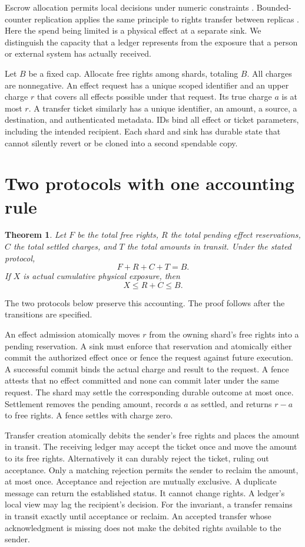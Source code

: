 \documentclass[11pt]{article}
\newtheorem{theorem}{Theorem}
\begin{document}
Escrow allocation permits local decisions under numeric constraints
\cite{oneil}. Bounded-counter replication applies the same principle
to rights transfer between replicas \cite{balegas}. Here the spend
being limited is a physical effect at a separate sink. We distinguish
the capacity that a ledger represents from the exposure that a person
or external system has actually received.

Let $B$ be a fixed cap. Allocate free rights among shards, totaling
$B$. All charges are nonnegative. An effect request has a unique
scoped identifier and an upper charge $r$ that covers all effects
possible under that request. Its true charge $a$ is at most $r$.
A transfer ticket similarly has a unique identifier, an amount,
a source, a destination, and authenticated metadata. IDs bind all
effect or ticket parameters, including the intended recipient.
Each shard and sink has durable state that cannot silently revert
or be cloned into a second spendable copy.

\section{Two protocols with one accounting rule}
\begin{theorem}
Let $F$ be the total free rights, $R$ the total pending effect
reservations, $C$ the total settled charges, and $T$ the total
amounts in transit. Under the stated protocol,
\[
F+R+C+T=B.
\]
If $X$ is actual cumulative physical exposure, then
\[
X\le R+C\le B.
\]
\end{theorem}

The two protocols below preserve this accounting. The proof follows
after the transitions are specified.

An effect admission atomically moves $r$ from the owning shard's
free rights into a pending reservation. A sink must enforce that
reservation and atomically either commit the authorized effect
once or fence the request against future execution. A successful
commit binds the actual charge and result to the request. A fence
attests that no effect committed and none can commit later under
the same request. The shard may settle the corresponding durable
outcome at most once. Settlement removes the pending amount,
records $a$ as settled, and returns $r-a$ to free rights. A fence
settles with charge zero.

Transfer creation atomically debits the sender's free rights and
places the amount in transit. The receiving ledger may accept the
ticket once and move the amount to its free rights. Alternatively
it can durably reject the ticket, ruling out acceptance. Only a
matching rejection permits the sender to reclaim the amount, at
most once. Acceptance and rejection are mutually exclusive.
A duplicate message can return the established status. It cannot
change rights. A ledger's local view may lag the recipient's
decision. For the invariant, a transfer remains in transit exactly
until acceptance or reclaim. An accepted transfer whose acknowledgment
is missing does not make the debited rights available to the sender.
\end{document}
